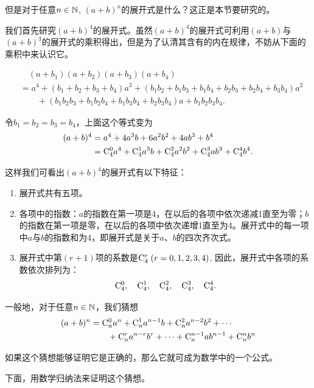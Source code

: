 但是对于任意$ n\in \N$, $(a+b)^{n}$的展开式是什么？这正是本节要研究的。

我们首先研究$ (a+b)^{4} $的展开式。虽然$ (a+b)^{4} $的展开式可利用$ (a+b) $与$ (a+b)^{3} $的展开式的乘积得出，但是为了认清其含有的内在规律，不妨从下面的乘积中来认识它。

\[\begin{split}
&\quad \left(a+b_{1}\right)\left(a+b_{2}\right)\left(a+b_{3}\right)\left(a+b_{4}\right)\\
&=a^{4}+\left(b_{1}+b_{2}+b_{3}+b_{4}\right)a^{3}+\left(b_{1}b_{2}+b_{1}b_{3}+b_{1}b_{4}+b_{2}b_{3}+b_{2}b_{4}+b_{3}b_{4}\right)a^{2}\\
&\qquad +\left(b_{1}b_{2}b_{3}+b_{1}b_{2}b_{4}+b_{1}b_{3}b_{4}+b_{2}b_{3}b_{4}\right)a+b_{1}b_{2}b_{3}b_{4}.    
\end{split}\]

令$b_{1}=b_{2}=b_{3}=b_{4}$，上面这个等式变为
\[\begin{split}
    (a+b)^{4}& =a^{4}+4a^{3}b+6a^{2}b^{2}+4ab^{3}+b^{4}\\ 
&=\comb{4}{0}a^{4}+\comb{4}{1}a^{3}b+\comb{4}{2}a^{2}b^{2}+\comb{4}{3}ab^{3}+\comb{4}{4}b^{4}.
\end{split}\]

这样我们可看出$ (a+b)^{4} $的展开式有以下特征：
\begin{enumerate}
    \item 展开式共有五项。
    \item 各项中的指数：$a$的指数在第一项是4，在以后的各项中依次递减1直至为零；$b$的指数在第一项是零，在以后的各项中依次递增1直至为4。展开式中的每一项中$a$与$b$的指数和为4，即展开式是关于$a$、$b$的四次齐次式。
    \item 展开式中第$( r+1 )$项的系数是$\comb{4}{r}\;   (r=0,1,2,3,4)$, 因此，展开式中各项的系数依次排列为：
\[\comb{4}{0},\quad \comb{4}{1},\quad \comb{4}{2},\quad \comb{4}{3},\quad \comb{4}{4}.\]
\end{enumerate}


一般地，对于任意$ n\in \N$，我们猜想
\[\begin{split}
(a+b)^{n}&=\comb{n}{0}a^{n}+\comb{n}{1}a^{n-1}b+\comb{n}{2}a^{n-2}b^{2}+\cdots\\
& \qquad +\comb{n}{r}a^{n-r}b^{r}+\cdots +\comb{n}{n-1}ab^{n-1}+\comb{n}{n}b^{n}    
\end{split}\]

如果这个猜想能够证明它是正确的，那么它就可成为数学中的一个公式。

下面，用数学归纳法来证明这个猜想。

